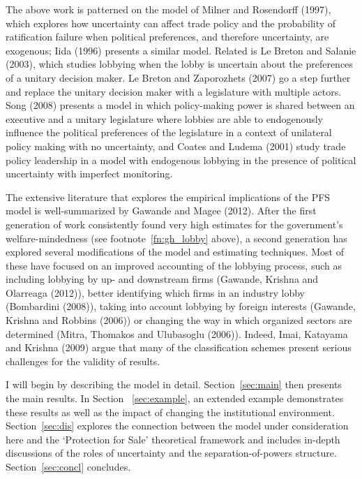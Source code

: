 \documentclass[10pt]{article}
\begin{document}
The above work is patterned on the model of Milner and Rosendorff (1997), which explores how uncertainty can affect trade policy and the probability of ratification failure when political preferences, and therefore uncertainty, are exogenous;  Iida (1996) presents a similar model. Related is Le Breton and Salanie (2003), which studies lobbying when the lobby is uncertain about the preferences of a unitary decision maker. Le Breton and Zaporozhets (2007) go a step further and replace the unitary decision maker with a legislature with multiple actors. Song (2008) presents a model in which policy-making power is shared between an executive and a unitary legislature where lobbies are able to endogenously influence the political preferences of the legislature in a context of unilateral policy making with no uncertainty, and Coates and Ludema (2001) study trade policy leadership in a model with endogenous lobbying in the presence of political uncertainty with imperfect monitoring.

The extensive literature that explores the empirical implications of the PFS model is well-summarized by Gawande and Magee (2012). After the first generation of work consistently found very high estimates for the government's welfare-mindedness (see footnote~\ref{fn:gh_lobby} above), a second generation has explored several modifications of the model and estimating techniques. Most of these have focused on an improved accounting of the lobbying process, such as including lobbying by up- and downstream firms (Gawande, Krishna and Olarreaga (2012)), better identifying which firms in an industry lobby (Bombardini (2008)), taking into account lobbying by foreign interests (Gawande, Krishna and Robbins (2006)) or changing the way in which organized sectors are determined (Mitra, Thomakos and Ulubasoglu (2006)). Indeed, Imai, Katayama and Krishna (2009) argue that many of the classification schemes present serious challenges for the validity of results.
	
I will begin by describing the model in detail. Section~\ref{sec:main} then presents the main results. In Section~ \ref{sec:example}, an extended example demonstrates these results as well as the impact of changing the institutional environment. Section~\ref{sec:dis} explores the connection between the model under consideration here and the `Protection for Sale' theoretical framework and includes in-depth discussions of the roles of uncertainty and the separation-of-powers structure. Section~\ref{sec:concl} concludes.
\end{document}
